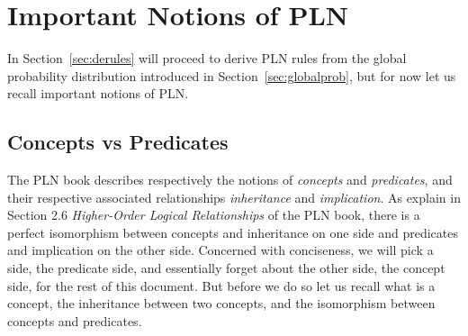 \documentclass[]{article}
\begin{document}
\section{Important Notions of PLN}
In Section~\ref{sec:derules} will proceed to derive PLN rules from the
global probability distribution introduced in
Section~\ref{sec:globalprob}, but for now let us recall important
notions of PLN.

\subsection{Concepts vs Predicates}
The PLN book describes respectively the notions of \emph{concepts} and
\emph{predicates}, and their respective associated relationships
\emph{inheritance} and \emph{implication}.  As explain in Section 2.6
\emph{Higher-Order Logical Relationships} of the PLN book, there is a
perfect isomorphism between concepts and inheritance on one side and
predicates and implication on the other side.  Concerned with
conciseness, we will pick a side, the predicate side, and essentially
forget about the other side, the concept side, for the rest of this
document.  But before we do so let us recall what is a concept, the
inheritance between two concepts, and the isomorphism between concepts
and predicates.
\end{document}
